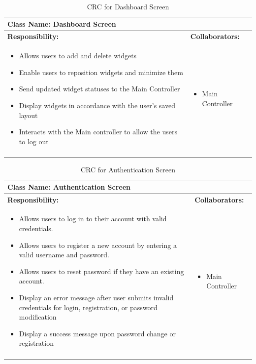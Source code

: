 \documentclass[]{article}
\begin{document}
\newpage
\begin{longtable}{| p{} | p{} |}
	\hline
	\multicolumn{2}{|l|}{\textbf{Class Name: Dashboard Screen}} \\
	\hline
	\textbf{Responsibility:} & \textbf{Collaborators:} \\
	\hline
	\begin{itemize}
		\item Allows users to add and delete widgets
		\item Enable users to reposition widgets and minimize them
		\item Send updated widget statuses to the Main Controller
		\item Display widgets in accordance with the user's saved layout
		\item Interacts with the Main controller to allow the users to log out 
    \end{itemize} & 
	\begin{itemize}
		\item Main Controller
	\end{itemize} \\
	\hline
	\caption{CRC for Dashboard Screen}
\end{longtable}

\begin{longtable}{| p{} | p{} |}
	\hline
	\multicolumn{2}{|l|}{\textbf{Class Name: Authentication Screen}} \\
	\hline
	\textbf{Responsibility:} & \textbf{Collaborators:} \\
	\hline
	\begin{itemize}
		\item Allows users to log in to their account with valid credentials.
		\item Allows users to register a new account by entering a valid username and password.
		\item Allows users to reset password if they have an existing account.
		\item Display an error message after user submits invalid credentials for login, registration, or password modification
		\item Display a success message upon password change or registration
    \end{itemize} & 
	\begin{itemize}
		\item Main Controller
	\end{itemize} \\
	\hline
	\caption{CRC for Authentication Screen}
\end{longtable}
\end{document}
